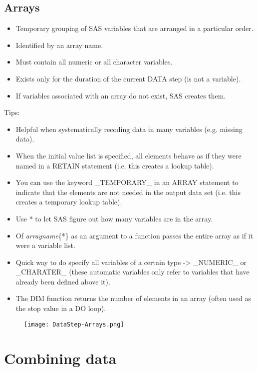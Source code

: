 \documentclass[11pt, oneside]{article}
\begin{document}
\subsection{Arrays}
	
\begin{itemize}
\item Temporary grouping of SAS variables that are arranged in a particular order.
\item Identified by an array name.
\item Must contain all numeric or all character variables.
\item Exists only for the duration of the current DATA step (is not a variable).
\item If variables associated with an array do not exist, SAS creates them.
\end{itemize}

Tips:
\begin{itemize}
\item Helpful when systematically recoding data in many variables (e.g. missing data).
\item When the initial value list is specified, all elements behave as if they were named in a RETAIN statement (i.e. this creates a lookup table).
\item You can use the keyword \_TEMPORARY\_ in an ARRAY statement to indicate that the elements are not needed in the output data set (i.e. this creates a temporary lookup table).
\item Use * to let SAS figure out how many variables are in the array.
\item Of \textit{arrayname}\{*\} as an argument to a function passes the entire array as if it were a variable list.
\item Quick way to do specify all variables of a certain type -> \_NUMERIC\_ or \_CHARATER\_ (these automatic variables only refer to variables that have already been defined above it).
\item The DIM function returns the number of elements in an array (often used as the stop value in a DO loop).
\end{itemize}	



\begin{figure}[H]
\texttt{[image: DataStep-Arrays.png]}
\end{figure}
	
\section{Combining data}
\end{document}
